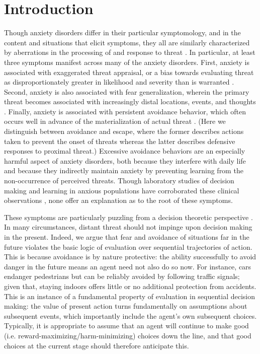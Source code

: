 \documentclass[11pt]{article} %
\begin{document}
\startmain

\section{Introduction}

Though anxiety disorders differ in their particular symptomology, and in the content and situations that elicit symptoms, they all are similarly characterized by aberrations in the processing of and response to threat \citep{dsm5}. In particular, at least three symptoms manifest across many of the anxiety disorders. First, anxiety is associated with exaggerated threat appraisal, or a bias towards evaluating threat as disproportionately greater in likelihood and severity than is warranted \citep{ClarkBeck2011}. Second, anxiety is also associated with fear generalization, wherein the primary threat becomes associated with increasingly distal locations, events, and thoughts \citep{dymond2015}. Finally, anxiety is associated with persistent avoidance behavior, which often occurs well in advance of the materialization of actual threat \citep{Arnaudova2017}. (Here we distinguish between avoidance and escape, where the former describes actions taken to prevent the onset of threats whereas the latter describes defensive responses to proximal threat.) Excessive avoidance behaviors are an especially harmful aspect of anxiety disorders, both because they interfere with daily life and because they indirectly maintain anxiety by preventing learning from the non-occurrence of perceived threats. Though laboratory studies of decision making and learning in anxious populations have corroborated these clinical observations \citep{Harle2017, norbury2018, Aylward2019}, none offer an explanation as to the root of these symptoms.

These symptoms are particularly puzzling from a decision theoretic perspective \citep{huys2015}. In many circumstances, distant threat should not impinge upon decision making in the present. Indeed, we argue that fear and avoidance of situations far in the future violates the basic logic of evaluation over sequential trajectories of action. This is because avoidance is by nature protective: the ability successfully to avoid danger in the future means an agent need not also do so now. For instance, cars endanger pedestrians but can be reliably avoided by following traffic signals; given that, staying indoors offers little or no additional protection from accidents. This is an instance of a fundamental property of evaluation in sequential decision making: the value of present action turns fundamentally on assumptions about subsequent events, which importantly include the agent's own subsequent choices. Typically, it is appropriate to assume that an agent will continue to make good (i.e. reward-maximizing/harm-minimizing) choices down the line, and that good choices at the current stage should therefore anticipate this.
\end{document}
